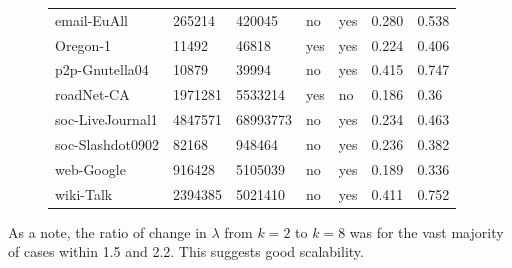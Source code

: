 \begin{figure}
{\begin{tabular}{ *7l }
email-EuAll & 265214 & 420045 & no & yes & 0.280&0.538\\
Oregon-1 & 11492 & 46818 & yes & yes & 0.224&0.406\\
p2p-Gnutella04 & 10879 & 39994 & no & yes & 0.415&0.747\\
roadNet-CA & 1971281 & 5533214 & yes & no & 0.186&0.36\\
soc-LiveJournal1 & 4847571 & 68993773 & no & yes &0.234& 0.463\\
soc-Slashdot0902 & 82168 & 948464 & no & yes &0.236&0.382\\
web-Google & 916428 & 5105039 & no & yes &0.189&0.336\\
wiki-Talk & 2394385 & 5021410 & no & yes &0.411&0.752\\
 \hline
\end{tabular}\par
}
\end{figure}

As a note, the ratio of change in $\lambda$ from $k=2$ to $k=8$ was for the vast majority of cases within 1.5 and 2.2. 
This suggests good scalability.


